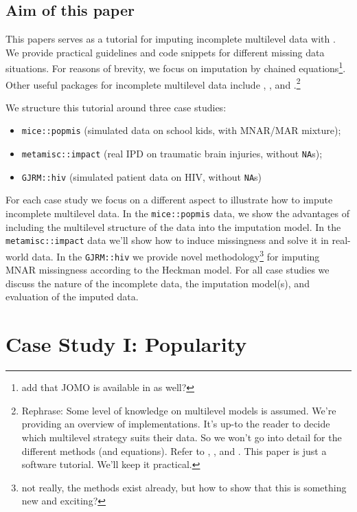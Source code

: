 \documentclass[
]{jss}
\begin{document}
\hypertarget{aim-of-this-paper}{%
\subsection{Aim of this paper}\label{aim-of-this-paper}}

This papers serves as a tutorial for imputing incomplete multilevel data
with . We provide practical guidelines and code snippets for
different missing data situations. For reasons of brevity, we focus on
imputation by chained equations\footnote{add that JOMO is available in
   as well?}. Other useful packages for incomplete multilevel
data include , , and .\footnote{Rephrase:
  Some level of knowledge on multilevel models is assumed. We're
  providing an overview of implementations. It's up-to the reader to
  decide which multilevel strategy suits their data. So we won't go into
  detail for the different methods (and equations). Refer to
  \citet{meng94}, \citet{audi18}, and \citet{grun18}. This paper is just
  a software tutorial. We'll keep it practical.}

We structure this tutorial around three case studies:

\begin{itemize}
\item
  \texttt{mice::popmis} (simulated data on school kids, with MNAR/MAR
  mixture);
\item
  \texttt{metamisc::impact} (real IPD on traumatic brain injuries,
  without \texttt{NA}s);
\item
  \texttt{GJRM::hiv} (simulated patient data on HIV, without
  \texttt{NA}s)
\end{itemize}

For each case study we focus on a different aspect to illustrate how to
impute incomplete multilevel data. In the \texttt{mice::popmis} data, we
show the advantages of including the multilevel structure of the data
into the imputation model. In the \texttt{metamisc::impact} data we'll
show how to induce missingness and solve it in real-world data. In the
\texttt{GJRM::hiv} we provide novel methodology\footnote{not really, the
  methods exist already, but how to show that this is something new and
  exciting?} for imputing MNAR missingness according to the Heckman
model. For all case studies we discuss the nature of the incomplete
data, the imputation model(s), and evaluation of the imputed data.

\hypertarget{case-study-i-popularity}{%
\section{Case Study I: Popularity}\label{case-study-i-popularity}}
\end{document}
